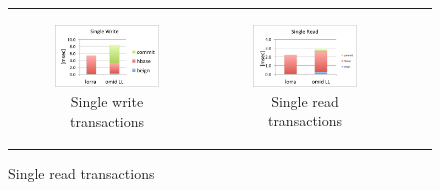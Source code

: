 


\begin{figure}[]
  \centering
  \begin{tabular}{cccc}
    
  \begin{subfigure}[t]{0.4\textwidth}
	\includegraphics[width=\textwidth]{figs/singlewrite.pdf}
	\caption[]{Single write transactions}
    \label{fig:latency:lorra1write}
  \end{subfigure} &

  \begin{subfigure}[t]{0.4\textwidth}
	\includegraphics[width=\textwidth]{figs/singleread.pdf}
	\caption[]{Single read transactions}
    \label{fig:latency:lorra1read}
  \end{subfigure} \\


\end{tabular}
\end{figure}
